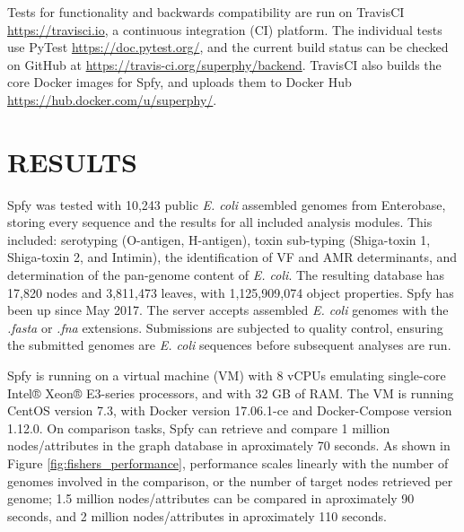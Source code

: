 \documentclass{article}
\begin{document}
Tests for functionality and backwards compatibility are run on TravisCI \url{https://travisci.io}, a continuous integration (CI) platform.
The individual tests use PyTest \url{https://doc.pytest.org/}, and the current build status can be checked on GitHub at \url{https://travis-ci.org/superphy/backend}.
TravisCI also builds the core Docker images for Spfy, and uploads them to Docker Hub \url{https://hub.docker.com/u/superphy/}.

\section{RESULTS}
Spfy was tested with 10,243 public \textit{E. coli} assembled genomes from Enterobase, storing every sequence and the results for all included analysis modules. This included: serotyping (O-antigen, H-antigen), toxin sub-typing (Shiga-toxin 1, Shiga-toxin 2, and Intimin), the identification of VF and AMR determinants, and determination of the pan-genome content of \textit{E. coli}.
The resulting database has 17,820 nodes and 3,811,473 leaves, with 1,125,909,074 object properties.
Spfy has been up since May 2017. The server accepts assembled \textit{E. coli} genomes with the \textit{.fasta} or \textit{.fna} extensions. Submissions are subjected to quality control, ensuring the submitted genomes are \textit{E. coli} sequences before subsequent analyses are run.
\par


Spfy is running on a virtual machine (VM) with 8 vCPUs emulating single-core Intel® Xeon® E3-series processors, and with 32 GB of RAM.
The VM is running CentOS version 7.3, with Docker version 17.06.1-ce and Docker-Compose version 1.12.0.
On comparison tasks, Spfy can retrieve and compare 1 million nodes/attributes in the graph database in aproximately 70 seconds.
As shown in Figure \ref{fig:fishers_performance}, performance scales linearly with the number of genomes involved in the comparison, or the number of target nodes retrieved per genome; 1.5 million nodes/attributes can be compared in aproximately 90 seconds, and 2 million nodes/attributes in aproximately 110 seconds.
\end{document}
